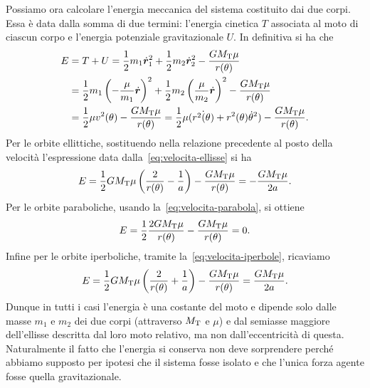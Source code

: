 {Possiamo ora calcolare l'energia meccanica del sistema costituito dai due
corpi. Essa è data dalla somma di due termini: l'energia cinetica $T$ associata
al moto di ciascun corpo e l'energia potenziale gravitazionale $U$. In
definitiva si ha che
\begin{equation}
  \label{eq:energia}
  \begin{split}
    E &= T + U = \frac{1}{2}m_1\dot{\bm{r}}_1^2 + \frac{1}{2}m_2\dot{\bm{r}}_2^2
    - \frac{GM_\textup{T}\mu}{r(\theta)} \\
    &= \frac{1}{2}m_1
    \left(
      -\frac{\mu}{m_1}\dot{\bm{r}}
    \right)^2 + \frac{1}{2}m_2
    \left(
      \frac{\mu}{m_2}\dot{\bm{r}}
    \right)^2 - \frac{GM_\textup{T}\mu}{r(\theta)} \\
    &= \frac{1}{2}\mu v^2(\theta)
    - \frac{GM_\textup{T}\mu}{r(\theta)} = \frac{1}{2}\mu(\dot{r^2(\theta)} +
    r^2(\theta)\dot{\theta}^2) - \frac{GM_\textup{T}\mu}{r(\theta)}.
  \end{split}
\end{equation}
Per le orbite ellittiche, sostituendo nella relazione precedente al posto della
velocità l'espressione data dalla~\eqref{eq:velocita-ellisse} si ha
\begin{equation}
  \label{eq:energia-ellisse}
  E = \frac{1}{2}GM_\textup{T}\mu
  \left(
    \frac{2}{r(\theta)} - \frac{1}{a}
  \right) - \frac{GM_\textup{T}\mu}{r(\theta)} = -\frac{GM_\textup{T}\mu}{2a}.
\end{equation}
Per le orbite paraboliche, usando la~\eqref{eq:velocita-parabola}, si ottiene
\begin{equation}
  E = \frac{1}{2}\frac{2GM_\textup{T}\mu}{r(\theta)} -
  \frac{GM_\textup{T}\mu}{r(\theta)} = 0.
\end{equation}
Infine per le orbite iperboliche, tramite la~\eqref{eq:velocita-iperbole},
ricaviamo
\begin{equation}
    \label{eq:energia-iperbole}
  E = \frac{1}{2}GM_\textup{T}\mu
  \left(
    \frac{2}{r(\theta)} + \frac{1}{a}
  \right) - \frac{GM_\textup{T}\mu}{r(\theta)} = \frac{GM_\textup{T}\mu}{2a}.
\end{equation}
Dunque in tutti i casi l'energia è una costante del moto e dipende solo dalle
masse $m_1$ e $m_2$ dei due corpi (attraverso $M_\textup{T}$ e $\mu$) e dal
semiasse maggiore dell'ellisse descritta dal loro moto relativo, ma non
dall'eccentricità di questa. Naturalmente il fatto che l'energia si conserva non
deve sorprendere perché abbiamo supposto per ipotesi che il sistema fosse
isolato e che l'unica forza agente fosse quella gravitazionale.

}
